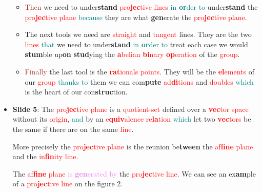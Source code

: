 \begin{itemize}
\begin{itemize}
                \item \textcolor{brown}{Then} we need to under\textbf{stand} \textcolor{red}{pro\textbf{jec}tive lines}
                    \textcolor{teal}{in \textbf{or}der to} under\textbf{stand} the \textcolor{red}{pro\textbf{jec}tive
                    plane} \textcolor{teal}{because}
                    they are what \textbf{gen}erate the \textcolor{red}{pro\textbf{jec}tive plane}.
                \item The next tools we need are \textcolor{red}{straight} and
                    \textcolor{red}{tangent} lines.
                    They are  the two \textcolor{red}{lines} \textcolor{teal}{that} we need to under\textbf{stand}
                    \textcolor{teal}{in \textbf{or}der to} treat
                    each case we would \textbf{stum}ble up\textbf{on} \textbf{stud}ying the \textcolor{red}{\textbf{a}belian \textbf{bi}nary
                        \textbf{op}eration} of the \textcolor{red}{group}.
                \item \textcolor{brown}{Finally} the last tool is the \textcolor{red}{\textbf{rat}ionals
                    points}.
                    They will be the \textcolor{red}{\textbf{el}ements} of our
                    \textcolor{red}{group} \textcolor{teal}{thanks to} them we can com\textbf{pute}
                    \textcolor{red}{ad\textbf{di}tions} and \textcolor{red}{doubles}
                    \textcolor{teal}{which} is the heart of our con\textbf{struc}tion.
            \end{itemize}
        \item \textbf{Slide 5}: The \textcolor{red}{pro\textbf{jec}tive plane} is a
            \textcolor{red}{quotient-set} defined over a
            \textcolor{red}{\textbf{vec}tor space} without its \textcolor{red}{origin},
            \textcolor{teal}{and} by an
            \textcolor{red}{e\textbf{quiv}alence re\textbf{la}tion} \textcolor{teal}{which} let
            two \textcolor{red}{\textbf{vec}tors} be the same if there are on the same
            \textcolor{red}{line}.

            More precisely the \textcolor{red}{pro\textbf{jec}tive plane} is the reunion be\textbf{tween} the
            \textcolor{red}{af\textbf{fine} plane}
            and the \textcolor{red}{in\textbf{fin}ity line}.

            The \textcolor{red}{af\textbf{fine} plane} \textcolor{violet}{is \textbf{gen}erated by} the \textcolor{red}{pro\textbf{jec}tive
                line}. We can see an ex\textbf{am}ple of a
            \textcolor{red}{pro\textbf{jec}tive line} on the figure 2. 


\end{itemize}
